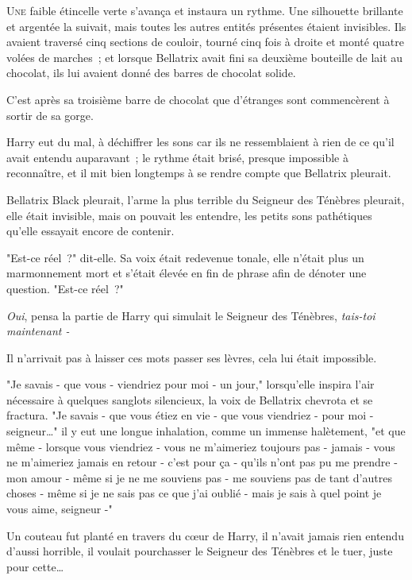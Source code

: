 
\lettrine{U}{ne} faible étincelle verte s'avança et instaura un rythme. Une silhouette brillante et argentée la suivait, mais toutes les autres entités présentes étaient invisibles. Ils avaient traversé cinq sections de couloir, tourné cinq fois à droite et monté quatre volées de marches~; et lorsque Bellatrix avait fini sa deuxième bouteille de lait au chocolat, ils lui avaient donné des barres de chocolat solide.

C'est après sa troisième barre de chocolat que d'étranges sont commencèrent à sortir de sa gorge.

Harry eut du mal, à déchiffrer les sons car ils ne ressemblaient à rien de ce qu'il avait entendu auparavant~; le rythme était brisé, presque impossible à reconnaître, et il mit bien longtemps à se rendre compte que Bellatrix pleurait.

Bellatrix Black pleurait, l'arme la plus terrible du Seigneur des Ténèbres pleurait, elle était invisible, mais on pouvait les entendre, les petits sons pathétiques qu'elle essayait encore de contenir.

"Est-ce réel~?" dit-elle. Sa voix était redevenue tonale, elle n'était plus un marmonnement mort et s'était élevée en fin de phrase afin de dénoter une question. "Est-ce réel~?"

\emph{Oui}, pensa la partie de Harry qui simulait le Seigneur des Ténèbres, \emph{tais-toi maintenant -}

Il n'arrivait pas à laisser ces mots passer ses lèvres, cela lui était impossible.

"Je savais - que vous - viendriez pour moi - un jour," lorsqu'elle inspira l'air nécessaire à quelques sanglots silencieux, la voix de Bellatrix chevrota et se fractura. "Je savais - que vous étiez en vie - que vous viendriez - pour moi - seigneur…" il y eut une longue inhalation, comme un immense halètement, "et que même - lorsque vous viendriez - vous ne m'aimeriez toujours pas - jamais - vous ne m'aimeriez jamais en retour - c'est pour ça - qu'ils n'ont pas pu me prendre - mon amour - même si je ne me souviens pas - me souviens pas de tant d'autres choses - même si je ne sais pas ce que j'ai oublié - mais je sais à quel point je vous aime, seigneur -"

Un couteau fut planté en travers du cœur de Harry, il n'avait jamais rien entendu d'aussi horrible, il voulait pourchasser le Seigneur des Ténèbres et le tuer, juste pour cette…


